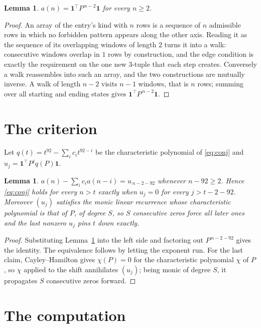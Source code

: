 \documentclass[11pt,a4paper]{article}
\theoremstyle{plain}
\newtheorem{lemma}[theorem]{Lemma}
\theoremstyle{definition}
\begin{document}
\begin{lemma}\label{lem:walk}
$a(n)=\mathbf{1}^{\!\top}P^{\,n-2}\mathbf{1}$ for every $n\ge2$.
\end{lemma}

\begin{proof}
An array of the entry's kind with $n$ rows is a sequence of $n$ admissible rows in
which no forbidden pattern appears along the other axis. Reading it as the sequence of its
overlapping windows of length $2$ turns it into a walk: consecutive windows overlap in
$1$ rows by construction, and the edge condition is exactly the requirement on the one
new $3$-tuple that each step creates. Conversely a walk reassembles into such an array,
and the two constructions are mutually inverse. A walk of length $n-2$ visits $n-1$
windows, that is $n$ rows; summing over all starting and ending states gives
$\mathbf{1}^{\!\top}P^{\,n-2}\mathbf{1}$.
\end{proof}

\section{The criterion}

Let $q(t)=t^{92}-\sum_i c_i t^{92-i}$ be the characteristic polynomial of
\eqref{eq:conj} and $u_j=\mathbf{1}^{\!\top}P^{j}q(P)\mathbf{1}$.

\begin{lemma}\label{lem:crit}
$a(n)-\sum_i c_i a(n-i)=u_{\,n-2-92}$ whenever $n-92\ge2$. Hence
\eqref{eq:conj} holds for every $n>t$ exactly when $u_j=0$ for every
$j>t-2-92$. Moreover $(u_j)$ satisfies the monic linear recurrence whose
characteristic polynomial is that of $P$, of degree $S$, so $S$ consecutive zeros force all
later ones and the last nonzero $u_j$ pins $t$ down exactly.
\end{lemma}

\begin{proof}
Substituting Lemma~\ref{lem:walk} into the left side and factoring out
$P^{\,n-2-92}$ gives the identity. The equivalence follows by letting the exponent
run. For the last claim, Cayley--Hamilton gives $\chi(P)=0$ for the characteristic
polynomial $\chi$ of $P$, so $\chi$ applied to the shift annihilates $(u_j)$; being monic of
degree $S$, it propagates $S$ consecutive zeros forward.
\end{proof}

\section{The computation}
\end{document}
